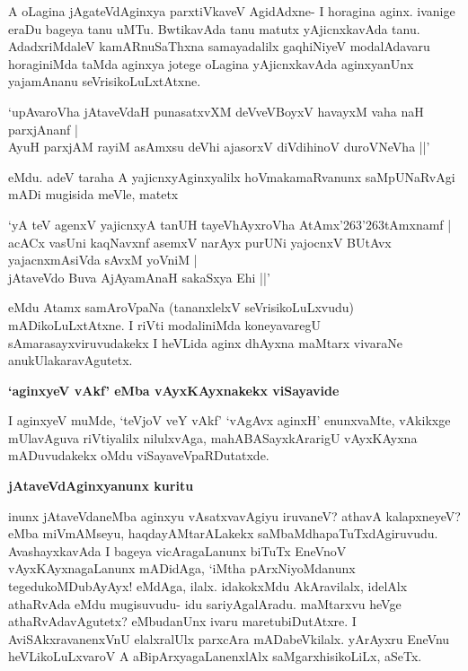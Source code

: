 A oLagina jAgateVdAginxya parxtiVkaveV AgidAdxne- I horagina aginx. ivanige eraDu bageya tanu uMTu. BwtikavAda tanu matutx yAjicnxkavAda tanu. AdadxriMdaleV kamARnuSaThxna samayadalilx gaqhiNiyeV modalAdavaru horaginiMda taMda aginxya jotege oLagina yAjicnxkavAda aginxyanUnx yajamAnanu seVrisikoLuLxtAtxne. 

\begin{shloka}
`upAvaroVha jAtaveVdaH punasatxvXM deVveVBoyxV havayxM vaha naH parxjAnanf |\\\label{211}
AyuH parxjAM rayiM asAmxsu deVhi ajasorxV diVdihinoV duroVNeVha ||'
\end{shloka}

eMdu. adeV taraha A yajicnxyAginxyalilx hoVmakamaRvanunx saMpUNaRvAgi mADi mugisida meVle, matetx

\begin{shloka}
`yA teV agenxV yajicnxyA tanUH tayeVhAyxroVha AtAmx\char'263\char'263tAmxnamf |\\\label{211}
acACx vasUni kaqNavxnf asemxV narAyx purUNi yajocnxV BUtAvx yajacnxmAsiVda sAvxM yoVniM |\\
jAtaveVdo Buva AjAyamAnaH sakaSxya Ehi ||'
\end{shloka}

eMdu Atamx samAroVpaNa (tananxlelxV seVrisikoLuLxvudu) mADikoLuLxtAtxne. I riVti modaliniMda koneyavaregU sAmarasayxviruvudakekx I heVLida aginx dhAyxna maMtarx vivaraNe anukUlakaravAgutetx.

\noindent
{\bf\large{`aginxyeV vAkf' eMba vAyxKAyxnakekx viSayavide}}\label{page211}

I aginxyeV muMde, `teVjoV veY vAkf'\label{212} `vAgAvx aginxH'\label{212} enunxvaMte, vAkikxge mUlavAguva riVtiyalilx nilulxvAga, mahABASayxkArarigU vAyxKAyxna mADuvudakekx oMdu viSayaveVpaRDutatxde.

\noindent
{\bf\large{jAtaveVdAginxyanunx kuritu}}\label{page212}

inunx jAtaveVdaneMba aginxyu vAsatxvavAgiyu iruvaneV? athavA kalapxneyeV? eMba miVmAMseyu, haqdayAMtarALakekx saMbaMdhapaTuTxdAgiruvudu. AvashayxkavAda I bageya vicAragaLanunx biTuTx EneVnoV vAyxKAyxnagaLanunx mADidAga, `iMtha pArxNiyoMdanunx tegedukoMDubAyAyx! eMdAga, ilalx. idakokxMdu AkAravilalx, idelAlx athaRvAda eMdu mugisuvudu- idu sariyAgalAradu. maMtarxvu heVge athaRvAdavAgutetx? eMbudanUnx ivaru maretubiDutAtxre. I AviSAkxravanenxVnU elalxralUlx parxcAra mADabeVkilalx. yArAyxru EneVnu heVLikoLuLxvaroV A aBipArxyagaLanenxlAlx saMgarxhisikoLiLx, aSeTx.

